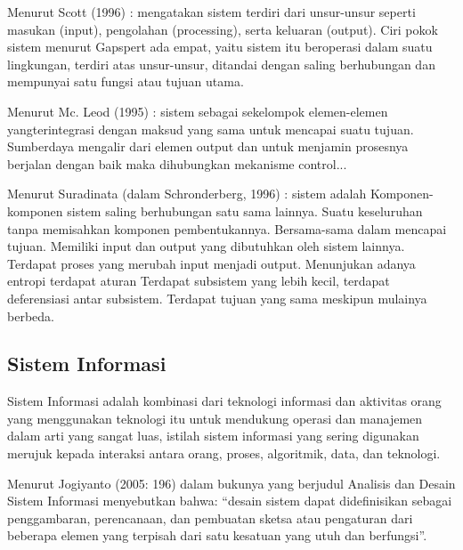 \documentclass{jtetiproposalskripsi}
\begin{document}
Menurut Scott (1996) : mengatakan sistem terdiri dari unsur-unsur seperti masukan (input), pengolahan (processing), serta keluaran (output). Ciri pokok sistem menurut Gapspert ada empat, yaitu sistem itu beroperasi dalam suatu lingkungan, terdiri atas unsur-unsur, ditandai dengan saling berhubungan dan mempunyai satu fungsi atau tujuan utama.

Menurut Mc. Leod (1995) : sistem sebagai sekelompok elemen-elemen yangterintegrasi dengan maksud yang sama untuk mencapai suatu tujuan. Sumberdaya mengalir dari elemen output dan untuk menjamin prosesnya berjalan dengan baik maka dihubungkan mekanisme control...

Menurut Suradinata (dalam Schronderberg, 1996) : sistem adalah Komponen-komponen sistem saling berhubungan satu sama lainnya. Suatu keseluruhan tanpa memisahkan komponen pembentukannya. Bersama-sama dalam mencapai tujuan. Memiliki input dan output yang dibutuhkan oleh sistem lainnya. Terdapat proses yang merubah input menjadi output. Menunjukan adanya entropi terdapat aturan Terdapat subsistem yang lebih kecil, terdapat deferensiasi antar subsistem. Terdapat tujuan yang sama meskipun mulainya berbeda.


\subsection{Sistem Informasi}
Sistem Informasi adalah kombinasi dari teknologi informasi dan aktivitas orang yang menggunakan teknologi itu untuk mendukung operasi dan manajemen dalam arti yang sangat luas, istilah sistem informasi yang sering digunakan merujuk kepada interaksi antara orang, proses, algoritmik, data, dan teknologi.

Menurut Jogiyanto (2005: 196) dalam  bukunya yang berjudul Analisis dan Desain Sistem Informasi  menyebutkan  bahwa:  “desain  sistem  dapat  didefinisikan  sebagai penggambaran, perencanaan, dan pembuatan sketsa atau pengaturan dari beberapa elemen yang terpisah dari satu kesatuan yang utuh dan berfungsi”.
\end{document}

